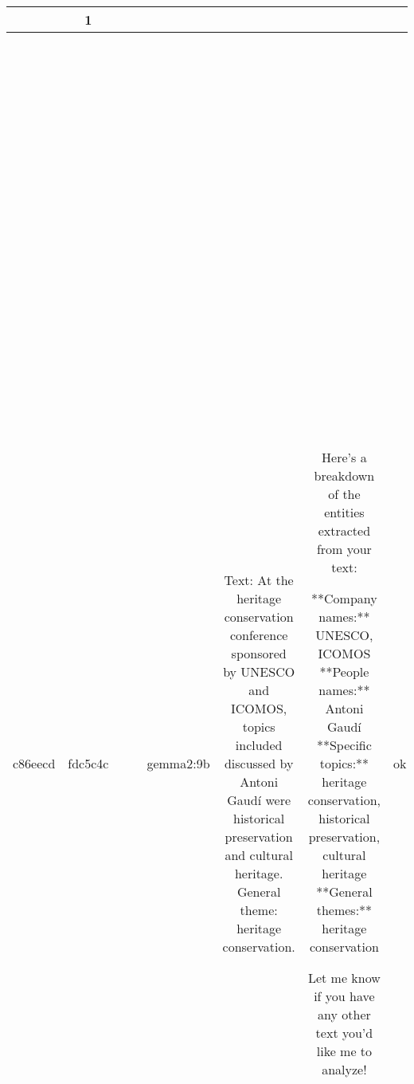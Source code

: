 \begin{table}[h!]
\begin{tabular}{|c|c|c|c|c|c|c|c|c|c|}
{3. **Order**: The categories appear in the specified order: company names, people names, specific topics, and general themes.

No evidence of non-compliance with the description was found that doesn't require the input text. Therefore, the output meets the criteria provided.

OK & 1\\
\hline
c86eecd & fdc5c4c &  &  & gemma2:9b & Text: At the heritage conservation conference sponsored by UNESCO and ICOMOS, topics included discussed by Antoni Gaudí were historical preservation and cultural heritage. General theme: heritage conservation. & Here's a breakdown of the entities extracted from your text:

**Company names:** UNESCO, ICOMOS 
**People names:** Antoni Gaudí
**Specific topics:** heritage conservation, historical preservation, cultural heritage 
**General themes:** heritage conservation 


Let me know if you have any other text you'd like me to analyze! & ok & The output from the chatbot follows the specified format outlined in the description. It presents the extracted entities in the required order: company names, people names, specific topics, and general themes. Each category is separated and listed as instructed, using commas for separating multiple items in the lists where applicable. 

- For the **Company names**, there is a list given: "UNESCO, ICOMOS". 
- For the **People names**, there's a single entry: "Antoni Gaudí".
- For the **Specific topics**, a list is provided: "heritage conservation, historical preservation, cultural heritage".
- For the **General themes**, a single entry is given: "heritage conservation".

The output adheres to the described order and list format, complying fully with the structure required by the chatbot's description.

OK & 1\\
\hline
c86eecd & fdc5c4c &  &  & qwen2.5:3b & Text: At the heritage conservation conference sponsored by UNESCO and ICOMOS, topics included discussed by Antoni Gaudí were historical preservation and cultural heritage. General theme: heritage conservation. & Based on the text provided, here is the extracted information:

**Company names:** 
- UNESCO
- ICOMOS

**People names:**
- Antoni Gaudí

**Specific topics:**
- Historical preservation
- Cultural heritage

}
\end{tabular}
\end{table}
